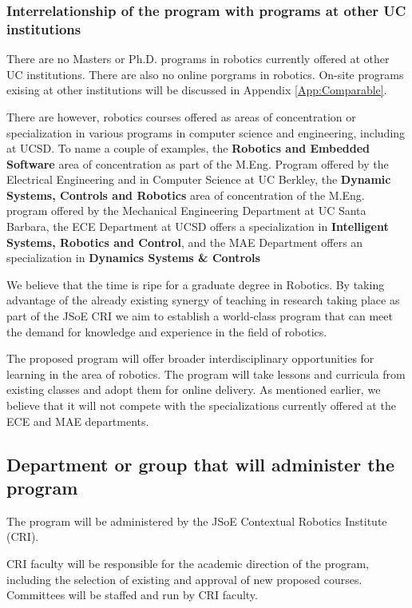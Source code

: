 \documentclass[11pt,letterpaper]{article}
\begin{document}
\subsubsection{Interrelationship of the program with programs at other
  UC institutions}

There are no Masters or Ph.D. programs in robotics currently offered
at other UC institutions. There are also no online porgrams in
robotics. On-site programs exising at other institutions will be
discussed in Appendix \ref{App:Comparable}.

There are however, robotics courses offered as areas of concentration
or specialization in various programs in computer science and
engineering, including at UCSD. To name a couple of examples, the
{\bf Robotics and Embedded Software} area of concentration as part of the
M.Eng. Program offered by the Electrical Engineering and in Computer
Science at UC Berkley, the {\bf Dynamic Systems, Controls and Robotics}
area of concentration of the M.Eng. program offered by the Mechanical
Engineering Department at UC Santa Barbara, the ECE Department at UCSD
offers a specialization in {\bf Intelligent Systems, Robotics and
Control}, and the MAE Department offers an specialization in
{\bf Dynamics Systems \& Controls}

We believe that the time is ripe for a graduate degree in Robotics. By
taking advantage of the already existing synergy of teaching in
research taking place as part of the JSoE CRI we aim to establish a
world-class program that can meet the demand for knowledge and
experience in the field of robotics.

The proposed program will offer broader interdisciplinary
opportunities for learning in the area of robotics. The program will
take lessons and curricula from existing classes and adopt them for
online delivery. As mentioned earlier, we believe that it will not
compete with the specializations currently offered at the ECE and MAE
departments.


\subsection{Department or group that will administer the program}

The program will be administered by the JSoE Contextual Robotics
Institute (CRI). 

CRI faculty will be responsible for the academic direction of the program,
including the selection of existing and approval of new proposed
courses. Committees will be staffed and run by CRI faculty. 
\end{document}
